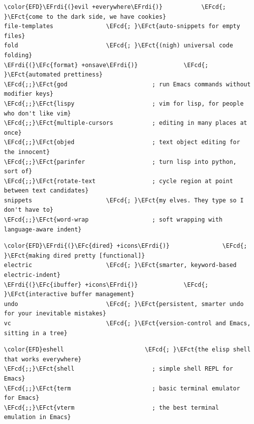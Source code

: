 \documentclass{scrartcl}
\newcommand{\EFct}[1]{\textcolor{EFct}{#1}} %
\newcommand{\EFc}[1]{\textcolor{EFc}{#1}} %
\newcommand{\EFcd}[1]{\textcolor{EFcd}{#1}} %
\newcommand{\EFrdi}[1]{#1} %
\begin{document}
\begin{enumerate}
\begin{Code}
\begin{Verbatim}[]
\color{EFD}\EFrdi{(}evil +everywhere\EFrdi{)}           \EFcd{; }\EFct{come to the dark side, we have cookies}
file-templates               \EFcd{; }\EFct{auto-snippets for empty files}
fold                         \EFcd{; }\EFct{(nigh) universal code folding}
\EFrdi{(}\EFc{format} +onsave\EFrdi{)}             \EFcd{; }\EFct{automated prettiness}
\EFcd{;;}\EFct{god                        ; run Emacs commands without modifier keys}
\EFcd{;;}\EFct{lispy                      ; vim for lisp, for people who don't like vim}
\EFcd{;;}\EFct{multiple-cursors           ; editing in many places at once}
\EFcd{;;}\EFct{objed                      ; text object editing for the innocent}
\EFcd{;;}\EFct{parinfer                   ; turn lisp into python, sort of}
\EFcd{;;}\EFct{rotate-text                ; cycle region at point between text candidates}
snippets                     \EFcd{; }\EFct{my elves. They type so I don't have to}
\EFcd{;;}\EFct{word-wrap                  ; soft wrapping with language-aware indent}
\end{Verbatim}
\end{Code}

\begin{Code}
\begin{Verbatim}[]
\color{EFD}\EFrdi{(}\EFc{dired} +icons\EFrdi{)}               \EFcd{; }\EFct{making dired pretty [functional]}
electric                     \EFcd{; }\EFct{smarter, keyword-based electric-indent}
\EFrdi{(}\EFc{ibuffer} +icons\EFrdi{)}             \EFcd{; }\EFct{interactive buffer management}
undo                         \EFcd{; }\EFct{persistent, smarter undo for your inevitable mistakes}
vc                           \EFcd{; }\EFct{version-control and Emacs, sitting in a tree}
\end{Verbatim}
\end{Code}

\begin{Code}
\begin{Verbatim}[]
\color{EFD}eshell                       \EFcd{; }\EFct{the elisp shell that works everywhere}
\EFcd{;;}\EFct{shell                      ; simple shell REPL for Emacs}
\EFcd{;;}\EFct{term                       ; basic terminal emulator for Emacs}
\EFcd{;;}\EFct{vterm                      ; the best terminal emulation in Emacs}
\end{Verbatim}
\end{Code}


\end{enumerate}
\end{document}
